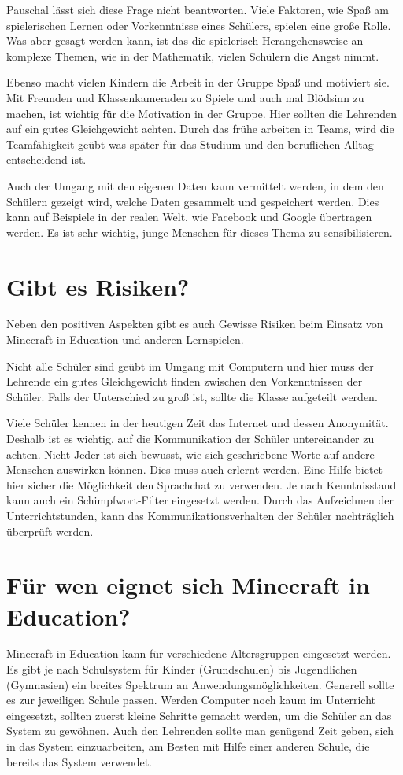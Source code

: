 Pauschal lässt sich diese Frage nicht beantworten. Viele Faktoren, wie Spaß am spielerischen Lernen oder Vorkenntnisse eines Schülers, spielen eine große Rolle. Was aber gesagt werden kann, ist das die spielerisch Herangehensweise an komplexe Themen, wie in der Mathematik, vielen Schülern die Angst nimmt.

Ebenso macht vielen Kindern die Arbeit in der Gruppe Spaß und motiviert sie. Mit Freunden und Klassenkameraden zu Spiele und auch mal Blödsinn zu machen, ist wichtig für die Motivation in der Gruppe. Hier sollten die Lehrenden auf ein gutes Gleichgewicht achten. Durch das frühe arbeiten in Teams, wird die Teamfähigkeit geübt was später für das Studium und den beruflichen Alltag entscheidend ist.

Auch der Umgang mit den eigenen Daten kann vermittelt werden, in dem den Schülern gezeigt wird, welche Daten gesammelt und gespeichert werden. Dies kann auf Beispiele in der realen Welt, wie Facebook und Google übertragen werden. Es ist sehr wichtig, junge Menschen für dieses Thema zu sensibilisieren.

\section{Gibt es Risiken?}

Neben den positiven Aspekten gibt es auch Gewisse Risiken beim Einsatz von Minecraft in Education und anderen Lernspielen.

Nicht alle Schüler sind geübt im Umgang mit Computern und hier muss der Lehrende ein gutes Gleichgewicht finden zwischen den Vorkenntnissen der Schüler. Falls der Unterschied zu groß ist, sollte die Klasse aufgeteilt werden.

Viele Schüler kennen in der heutigen Zeit das Internet und dessen Anonymität. Deshalb ist es wichtig, auf die Kommunikation der Schüler untereinander zu achten. Nicht Jeder ist sich bewusst, wie sich geschriebene Worte auf andere Menschen auswirken können. Dies muss auch erlernt werden. Eine Hilfe bietet hier sicher die Möglichkeit den Sprachchat zu verwenden. Je nach Kenntnisstand kann auch ein Schimpfwort-Filter eingesetzt werden. Durch das Aufzeichnen der Unterrichtstunden, kann das Kommunikationsverhalten der Schüler nachträglich überprüft werden.

\section{Für wen eignet sich Minecraft in Education?}
Minecraft in Education kann für verschiedene Altersgruppen eingesetzt werden. Es gibt je nach Schulsystem für Kinder (Grundschulen) bis Jugendlichen (Gymnasien) ein breites Spektrum an Anwendungsmöglichkeiten. Generell sollte es zur jeweiligen Schule passen. Werden Computer noch kaum im Unterricht eingesetzt, sollten zuerst kleine Schritte gemacht werden, um die Schüler an das System zu gewöhnen.
Auch den Lehrenden sollte man genügend Zeit geben, sich in das System einzuarbeiten, am Besten mit Hilfe einer anderen Schule, die bereits das System verwendet.

